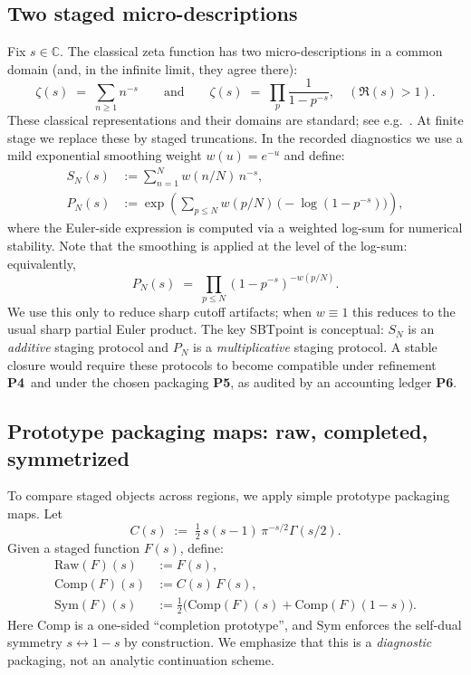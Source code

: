 \documentclass[apajournal,article,submit,moreauthors,pdftex]{Definitions/mdpi}
\newcommand{\SBT}{\textsc{SBT}}
\newcommand{\Pfour}{\textbf{P4}}
\newcommand{\Pfive}{\textbf{P5}}
\newcommand{\Psix}{\textbf{P6}}
\begin{document}
\subsection{Two staged micro-descriptions}
Fix $s\in\mathbb{C}$.
The classical zeta function has two micro-descriptions in a common domain (and, in the infinite limit, they agree there):
\[
\zeta(s)\;=\;\sum_{n\ge 1} n^{-s}
\qquad\text{and}\qquad
\zeta(s)\;=\;\prod_{p}\frac{1}{1-p^{-s}},
\quad (\Re(s)>1).
\]
These classical representations and their domains are standard; see e.g.\ \cite{Titchmarsh1986}.
At finite stage we replace these by staged truncations.
In the recorded diagnostics we use a mild exponential smoothing weight $w(u)=e^{-u}$ and define:
\begin{align*}
S_N(s) &:= \sum_{n=1}^{N} w(n/N)\,n^{-s},
\\
P_N(s) &:= \exp\!\left(\sum_{p\le N} w(p/N)\,\bigl(-\log(1-p^{-s})\bigr)\right),
\end{align*}
where the Euler-side expression is computed via a weighted log-sum for numerical stability.
Note that the smoothing is applied at the level of the log-sum:
equivalently,
\[
P_N(s) \;=\; \prod_{p\le N} (1-p^{-s})^{-w(p/N)}.
\]
We use this only to reduce sharp cutoff artifacts; when $w\equiv 1$ this reduces to the usual sharp partial Euler product.
The key \SBT point is conceptual:
$S_N$ is an \emph{additive} staging protocol and $P_N$ is a \emph{multiplicative} staging protocol.
A stable closure would require these protocols to become compatible under refinement \Pfour\ and under the chosen packaging \Pfive, as audited by an accounting ledger \Psix.

\subsection{Prototype packaging maps: raw, completed, symmetrized}
To compare staged objects across regions, we apply simple prototype packaging maps.
Let
\[
C(s)\;:=\;\tfrac12\,s(s-1)\,\pi^{-s/2}\Gamma(s/2).
\]
Given a staged function $F(s)$, define:
\begin{align*}
\mathrm{Raw}(F)(s) &:= F(s),
\\
\mathrm{Comp}(F)(s) &:= C(s)\,F(s),
\\
\mathrm{Sym}(F)(s) &:= \tfrac12\bigl(\mathrm{Comp}(F)(s)+\mathrm{Comp}(F)(1-s)\bigr).
\end{align*}
Here $\mathrm{Comp}$ is a one-sided ``completion prototype'', and $\mathrm{Sym}$ enforces the self-dual symmetry $s\leftrightarrow 1-s$ by construction.
We emphasize that this is a \emph{diagnostic} packaging, not an analytic continuation scheme.
\end{document}
